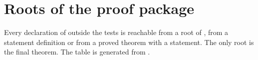 \section{Roots of the proof package}\label{sec:limits-roots}

Every declaration of  outside the tests is reachable from a root of
, from a statement definition or from a proved theorem with a statement. The
only root is the final theorem. The table is generated from .


